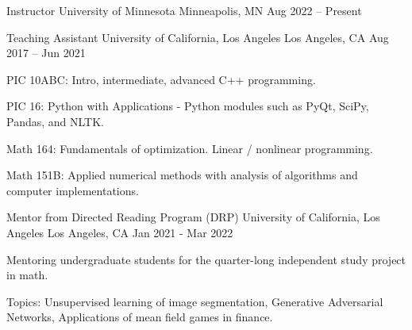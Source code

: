 
\begingroup
\allowdisplaybreaks
\begin{cventries}

  \cventry
    {Instructor} %
    {University of Minnesota} %
    {Minneapolis, MN} %
    {Aug 2022 – Present} %
    {
      \begin{cvteachings}
      \end{cvteachings}
    }

\begingroup
\allowdisplaybreaks
  \cventry
    {Teaching Assistant} %
    {University of California, Los Angeles} %
    {Los Angeles, CA} %
    {Aug 2017 – Jun 2021} %
    {
      \begin{cvitems} %
        \item {PIC 10ABC: Intro, intermediate, advanced C++ programming.}
        \item {PIC 16: Python with Applications} - Python modules such as PyQt, SciPy, Pandas, and NLTK.
        \item {Math 164: Fundamentals of optimization. Linear / nonlinear programming}.
        \item {Math 151B: Applied numerical methods with analysis of algorithms and computer implementations}.
      \end{cvitems}
    }
\endgroup

  \cventry
    {Mentor from Directed Reading Program (DRP)} %
    {University of California, Los Angeles} %
    {Los Angeles, CA} %
    {Jan 2021 - Mar 2022} %
    {
      \begin{cvitems} %
        \item Mentoring undergraduate students for the quarter-long independent study project in math.
        \item Topics: Unsupervised learning of image segmentation, Generative Adversarial Networks, Applications of mean field games in finance.
      \end{cvitems}
    }

\end{cventries}
\endgroup

